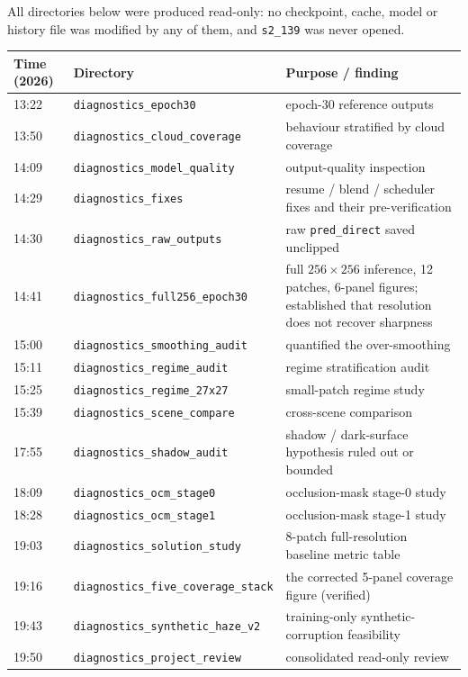 \documentclass[10pt,a4paper]{article}
\newcommand{\code}[1]{\texttt{#1}}
\begin{document}
All directories below were produced read-only: no checkpoint, cache, model or history file was
modified by any of them, and \code{s2\_139} was never opened.

\begin{center}
\begin{tabular}{@{}llp{8.2cm}@{}}
\hline
Time (2026) & Directory & Purpose / finding \\
\hline
13:22 & \code{diagnostics\_epoch30} & epoch-30 reference outputs \\
13:50 & \code{diagnostics\_cloud\_coverage} & behaviour stratified by cloud coverage \\
14:09 & \code{diagnostics\_model\_quality} & output-quality inspection \\
14:29 & \code{diagnostics\_fixes} & resume / blend / scheduler fixes and their pre-verification \\
14:30 & \code{diagnostics\_raw\_outputs} & raw \code{pred\_direct} saved unclipped \\
14:41 & \code{diagnostics\_full256\_epoch30} & full $256\times256$ inference, 12 patches, 6-panel figures; established that resolution does not recover sharpness \\
15:00 & \code{diagnostics\_smoothing\_audit} & quantified the over-smoothing \\
15:11 & \code{diagnostics\_regime\_audit} & regime stratification audit \\
15:25 & \code{diagnostics\_regime\_27x27} & small-patch regime study \\
15:39 & \code{diagnostics\_scene\_compare} & cross-scene comparison \\
17:55 & \code{diagnostics\_shadow\_audit} & shadow / dark-surface hypothesis ruled out or bounded \\
18:09 & \code{diagnostics\_ocm\_stage0} & occlusion-mask stage-0 study \\
18:28 & \code{diagnostics\_ocm\_stage1} & occlusion-mask stage-1 study \\
19:03 & \code{diagnostics\_solution\_study} & 8-patch full-resolution baseline metric table \\
19:16 & \code{diagnostics\_five\_coverage\_stack} & the corrected 5-panel coverage figure (verified) \\
19:43 & \code{diagnostics\_synthetic\_haze\_v2} & training-only synthetic-corruption feasibility \\
19:50 & \code{diagnostics\_project\_review} & consolidated read-only review \\
\hline
\end{tabular}
\end{center}
\end{document}
